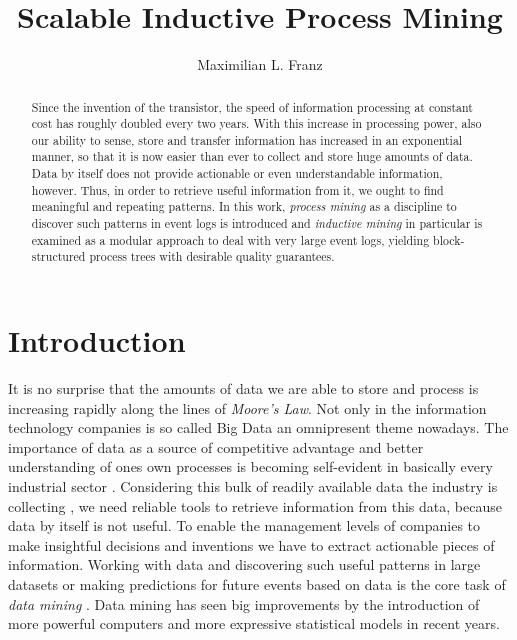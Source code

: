 \documentclass[a4paper]{IEEEtran}
\title{Scalable Inductive Process Mining}
\author{Maximilian L. Franz}
\begin{document}
\theoremstyle{plain}
\newtheorem{thm}{Theorem}[] %

\theoremstyle{definition}
\newtheorem{defn}[thm]{Definition} %
\newtheorem{exmp}[thm]{Example} %


\maketitle

\begin{abstract}
Since the invention of the transistor, the speed of information processing at constant cost has roughly doubled every two years. With this increase in processing power, also our ability to sense, store and transfer information has increased in an exponential manner, so that it is now easier than ever to collect and store huge amounts of data. Data by itself does not provide actionable  or even understandable information, however. Thus, in order to retrieve useful information from it, we ought to find meaningful and repeating patterns.
In this work, \textit{process mining} as a discipline to discover such patterns in event logs is introduced and \textit{inductive mining} in particular is examined as a modular approach to deal with very large event logs, yielding block-structured process trees with desirable quality guarantees.
\end{abstract}

\section{Introduction}
It is no surprise that the amounts of data we are able to store and process is increasing rapidly along the lines of \textit{Moore's Law}. Not only in the information technology companies is so called Big Data an omnipresent theme nowadays. The importance of data as a source of competitive advantage and better understanding of ones own processes is becoming self-evident in basically every industrial sector \cite{manyika2011bigdata}.
Considering this bulk of readily available data the industry is collecting \cite{hilbert2011worldcapacity}, we need reliable tools to retrieve information from this data, because data by itself is not useful. To enable the management levels of companies to make insightful decisions and inventions we have to extract actionable pieces of information. Working with data and discovering such useful patterns in large datasets or making predictions for future events based on data is the core task of \textit{data mining} \cite{DataMiningPrinciples}. Data mining has seen big improvements by the introduction of more powerful computers and more expressive statistical models in recent years.
\end{document}
